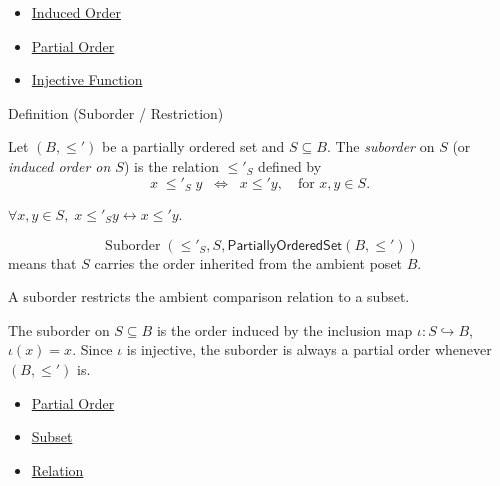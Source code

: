 \begin{dependencies}
\begin{itemize}
  \item \hyperref[def:induced-order]{Induced Order}
  \item \hyperref[def:partial-order]{Partial Order}
  \item \hyperref[def:injective]{Injective Function}
\end{itemize}
\end{dependencies}


\begin{definitionbox}{Definition (Suborder / Restriction)}
\begin{definition}\label{def:suborder}
Let $(B, \leq')$ be a partially ordered set and $S \subseteq B$. The
\emph{suborder} on $S$ (or \emph{induced order on $S$}) is the relation
$\leq'_S$ defined by
\[
x \;\leq'_S\; y
\;\;\Longleftrightarrow\;\;
x \leq' y,
\quad \text{for } x, y \in S.
\]
\end{definition}
\end{definitionbox}

\begin{remark*}
$\forall x,y\in S,\; x\leq'_S y \leftrightarrow x\leq' y$.
\end{remark*}

\begin{remark*}
\[
  \operatorname{Suborder}(\leq'_S,S,\mathsf{PartiallyOrderedSet}(B,\leq'))
\]
means that $S$ carries the order inherited from the ambient poset $B$.
\end{remark*}

\begin{remark*}[Interpretation]
A suborder restricts the ambient comparison relation to a subset.
\end{remark*}

\begin{remark*}[Exposition]
The suborder on $S\subseteq B$ is the order induced by the inclusion map
$\iota:S\hookrightarrow B$, $\iota(x)=x$. Since $\iota$ is injective, the
suborder is always a partial order whenever $(B,\leq')$ is.
\end{remark*}

\begin{dependencies}
\begin{itemize}
  \item \hyperref[def:partial-order]{Partial Order}
  \item \hyperref[def:subset]{Subset}
  \item \hyperref[def:relation]{Relation}
\end{itemize}
\end{dependencies}

